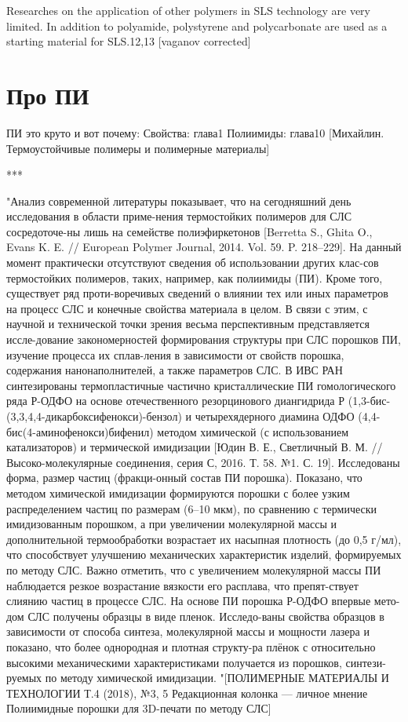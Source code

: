 	Researches on the application of other polymers in SLS technology are very limited. In addition to polyamide, polystyrene and polycarbonate are used as a starting material for SLS.12,13
	[vaganov corrected]
	
	\section{Про ПИ}

	
	ПИ это круто и вот почему:
	Свойства: глава1
	Полиимиды: глава10
	[Михайлин. Термоустойчивые полимеры и полимерные материалы]
	
	
	
	***
	
	
	"Анализ современной литературы показывает, что на сегодняшний день исследования в области приме-нения термостойких полимеров для СЛС сосредоточе-ны лишь на семействе полиэфиркетонов [Berretta S., Ghita O., Evans K. E. // European Polymer Journal, 2014. Vol. 59. P. 218–229]. На данный момент практически отсутствуют сведения об использовании других клас-сов термостойких полимеров, таких, например, как полиимиды (ПИ). Кроме того, существует ряд проти-воречивых сведений о влиянии тех или иных параметров на процесс СЛС и конечные свойства материала в целом. В связи с этим, с научной и технической точки зрения весьма перспективным представляется иссле-дование закономерностей формирования структуры при СЛС порошков ПИ, изучение процесса их сплав-ления в зависимости от свойств порошка, содержания нанонаполнителей, а также параметров СЛС.
	В ИВС РАН синтезированы термопластичные частично кристаллические ПИ гомологического ряда Р-ОДФО на основе отечественного резорцинового диангидрида Р (1,3-бис-(3,3,4,4-дикарбоксифенокси)-бензол) и четырехядерного диамина ОДФО (4,4-бис(4-аминофенокси)бифенил) методом химической (с использованием катализаторов) и термической имидизации [Юдин В. Е., Светличный В. М. // Высоко-молекулярные соединения, серия С, 2016. Т. 58. №1. С. 19]. Исследованы форма, размер частиц (фракци-онный состав ПИ порошка). Показано, что методом химической имидизации формируются порошки с более узким распределением частиц по размерам (6–10 мкм), по сравнению с термически имидизованным порошком, а при увеличении молекулярной массы и дополнительной термообработки возрастает их насыпная плотность (до 0,5 г/мл), что способствует улучшению механических характеристик изделий, формируемых по методу СЛС. Важно отметить, что с увеличением молекулярной массы ПИ наблюдается резкое возрастание вязкости его расплава, что препят-ствует слиянию частиц в процессе СЛС.
На основе ПИ порошка Р-ОДФО впервые мето-дом СЛС получены образцы в виде пленок. Исследо-ваны свойства образцов в зависимости от способа синтеза, молекулярной массы и мощности лазера и показано, что более однородная и плотная структу-ра плёнок с относительно высокими механическими характеристиками получается из порошков, синтези-руемых по методу химической имидизации.
	"[ПОЛИМЕРНЫЕ МАТЕРИАЛЫ И ТЕХНОЛОГИИ Т.4 (2018), №3, 5
Редакционная колонка — личное мнение
Полиимидные порошки для 3D-печати по методу СЛС]
	

